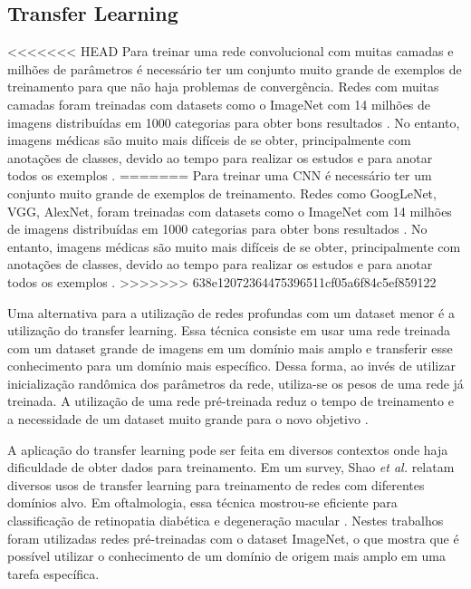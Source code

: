 \documentclass[conference]{IEEEtran}
\begin{document}



  \subsection{Transfer Learning}


<<<<<<< HEAD
  Para treinar uma rede convolucional com muitas camadas e milhões de parâmetros é necessário ter um conjunto muito grande de exemplos de treinamento para que não haja problemas de convergência. Redes com muitas camadas foram treinadas com datasets como o ImageNet com 14 milhões de imagens distribuídas em 1000 categorias para obter bons resultados \cite{ILSVRC15}. No entanto, imagens médicas são muito mais difíceis de se obter, principalmente com anotações de classes, devido ao tempo para realizar os estudos e para anotar todos os exemplos \cite{greenspan2016}.
=======
  Para treinar uma CNN é necessário ter um conjunto muito grande de exemplos de treinamento. Redes como GoogLeNet, VGG, AlexNet, foram treinadas com datasets como o ImageNet com 14 milhões de imagens distribuídas em 1000 categorias para obter bons resultados \cite{ILSVRC15}. No entanto, imagens médicas são muito mais difíceis de se obter, principalmente com anotações de classes, devido ao tempo para realizar os estudos e para anotar todos os exemplos \cite{greenspan2016}.
>>>>>>> 638e12072364475396511cf05a6f84c5ef859122
  
  Uma alternativa para a utilização de redes profundas com um dataset menor é a utilização do transfer learning. Essa técnica consiste em usar uma rede treinada com um dataset grande de imagens em um domínio mais amplo e transferir esse conhecimento para um domínio mais específico. Dessa forma, ao invés de utilizar inicialização randômica dos parâmetros da rede, utiliza-se os pesos de uma rede já treinada. A utilização de uma rede pré-treinada reduz o tempo de treinamento e a necessidade de um dataset muito grande para o novo objetivo \cite{tan2018}.

  A aplicação do transfer learning pode ser feita em diversos contextos onde haja dificuldade de obter dados para treinamento. Em um survey, Shao \textit{et al.} \cite{shao2015} relatam diversos usos de transfer learning para treinamento de redes com diferentes domínios alvo. Em oftalmologia, essa técnica mostrou-se eficiente para classificação de retinopatia diabética \cite{li2017} e degeneração macular \cite{lee2017}. Nestes trabalhos foram utilizadas redes pré-treinadas com o dataset ImageNet, o que mostra que é possível utilizar o conhecimento de um domínio de origem mais amplo em uma tarefa específica. 
\end{document}
